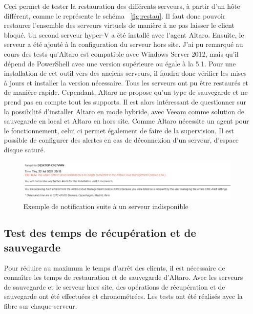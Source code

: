 \documentclass[pfe]{tnreport} %
\begin{document}
Ceci permet de tester la restauration des différents serveurs, à partir d'un hôte différent, comme le représente le schéma ~\ref{fig:restau}. \newline
Il faut donc pouvoir restaurer l'ensemble des serveurs virtuels de manière à ne pas laisser le client bloqué. \newline
Un second serveur hyper-V a été installé avec l'agent Altaro. Ensuite, le serveur a été ajouté à la configuration du serveur hors site. \newline
J'ai pu remarqué au cours des tests qu'Altaro est compatible avec Windows Server 2012, mais qu'il dépend de PowerShell avec une version supérieure ou égale à  la 5.1. \newline 
Pour une installation de cet outil vers des anciens serveurs, il faudra donc vérifier les mises à jours et installer la version nécessaire.\newline
Tous les serveurs ont pu être restaurés et de manière rapide. \newline
Cependant, Altaro ne propose qu'un type de sauvegarde et ne prend pas en compte tout les supports. Il est alors intéressant de questionner sur la possibilité d'installer Altaro en mode hybride, avec Veeam comme solution de sauvegarde en local et Altaro en hors site. \newline
Comme Altaro nécessite un agent pour le fonctionnement, celui ci permet également de faire de la supervision. \newline
Il est possible de configurer des alertes en cas de déconnexion d'un serveur, d'espace disque saturé. 

\begin{figure}[ht]
 \centering
 \includegraphics[width=15cm]{figures/mail altaro offline.png}
 \caption{Exemple de notification suite à un serveur indisponible}
 \label{fig:offline}
\end{figure}


\subsection{Test des temps de récupération et de sauvegarde}

Pour réduire au maximum le temps d'arrêt des clients, il est nécessaire de connaître les temps de restauration et de sauvegarde d'Altaro. \newline
Avec les serveurs de sauvegarde et le serveur hors site, des opérations de récupération et de sauvegarde ont été effectuées et chronométrées. Les tests ont été réalisés avec la fibre sur chaque serveur. \newline
\end{document}
